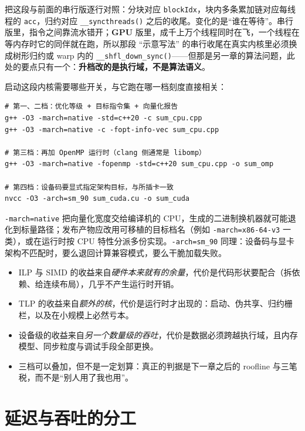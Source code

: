 \documentclass[12pt,a4paper,fontset=fandol]{ctexbook}
\newcommand{\Fn}[1]{\texttt{#1()}}
\newcommand{\Tp}[1]{\texttt{#1}}
\newcommand{\Dom}[1]{\textsf{\bfseries #1}}
\newcommand{\GPU}{\Dom{GPU}}
\begin{document}
把这段与前面的串行版逐行对照：分块对应 \Tp{blockIdx}，块内多条累加链对应每线程的 \Tp{acc}，归约对应 \Tp{\_\_syncthreads()} 之后的收尾。变化的是``谁在等待''。串行版里，指令之间靠流水错开；\GPU{} 版里，成千上万个线程同时在飞，一个线程在等内存时它的同伴就在跑，所以那段 ``示意写法'' 的串行收尾在真实内核里必须换成树形归约或 warp 内的 \Fn{\_\_shfl\_down\_sync}——但那是另一章的算法问题，此处的要点只有一个：\textbf{升档改的是执行域，不是算法语义}。

启动这段内核需要哪些开关，与它跑在哪一档刻度直接相关：

\begin{lstlisting}[style=shellstyle,caption={四档刻度各自对应的编译开关}]
# 第一、二档：优化等级 + 目标指令集 + 向量化报告
g++ -O3 -march=native -std=c++20 -c sum_cpu.cpp
g++ -O3 -march=native -c -fopt-info-vec sum_cpu.cpp

# 第三档：再加 OpenMP 运行时（clang 侧通常是 libomp）
g++ -O3 -march=native -fopenmp -std=c++20 sum_cpu.cpp -o sum_omp

# 第四档：设备码要显式指定架构目标，与所插卡一致
nvcc -O3 -arch=sm_90 sum_cuda.cu -o sum_cuda
\end{lstlisting}

\Tp{-march=native} 把向量化宽度交给编译机的 CPU，生成的二进制换机器就可能退化到标量路径；发布产物应改用可移植的目标档名（例如 \Tp{-march=x86-64-v3} 一类），或在运行时按 CPU 特性分派多份实现。\Tp{-arch=sm\_90} 同理：设备码与显卡架构不匹配时，要么退回计算兼容模式，要么干脆加载失败。

\begin{compare}[title={三笔收益、三种代价：把四档刻度排成一条链}]
\begin{itemize}
\item ILP 与 SIMD 的收益来自\emph{硬件本来就有的余量}，代价是代码形状要配合（拆依赖、给连续布局），几乎不产生运行时开销。
\item TLP 的收益来自\emph{额外的核}，代价是运行时才出现的：启动、伪共享、归约栅栏，以及在小规模上必然亏本。
\item 设备级的收益来自\emph{另一个数量级的吞吐}，代价是数据必须跨越执行域，且内存模型、同步粒度与调试手段全部更换。
\item 三档可以叠加，但不是一定划算：真正的判据是下一章之后的 roofline 与三笔税，而不是``别人用了我也用''。
\end{itemize}
\end{compare}

\section{延迟与吞吐的分工}
\end{document}
